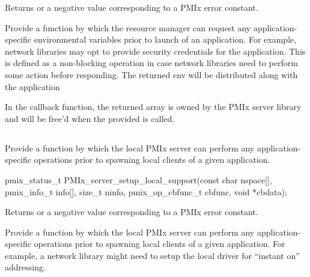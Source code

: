 Returns  or a negative value corresponding to a PMIx error constant.

\descr

Provide a function by which the resource manager can request any application-specific environmental variables prior to launch of an application.
For example, network libraries may opt to provide security credentials for the application.
This is defined as a non-blocking operation in case network libraries need to perform some action before responding.
The returned env will be distributed along with the application

In the callback function, the returned  array is owned by the PMIx server library and will be free'd when the provided  is called.


\subsection{}

\summary

Provide a function by which the local PMIx server can perform any application-specific operations prior to spawning local clients of a given application.

\format

\cspecificstart
\begin{codepar}
pmix_status_t PMIx_server_setup_local_support(const char nspace[],
                                              pmix_info_t info[], size_t ninfo,
                                              pmix_op_cbfunc_t cbfunc, void *cbdata);
\end{codepar}
\cspecificend

\begin{arglist}
\end{arglist}

Returns  or a negative value corresponding to a PMIx error constant.

\descr

Provide a function by which the local PMIx server can perform any application-specific operations prior to spawning local clients of a given application.
For example, a network library might need to setup the local driver for ``instant on'' addressing.


